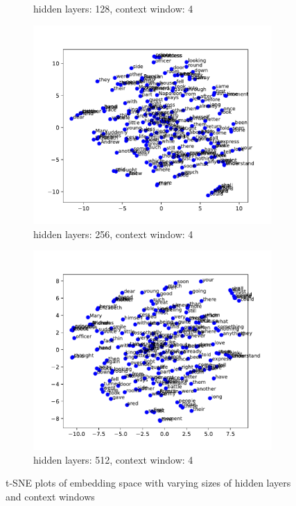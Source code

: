 \documentclass[12pt]{article} \usepackage{COSC420style} \usepackage{soul}
\begin{document}
\begin{figure}[htbp]
\begin{subfigure}[b]{0.45\textwidth}
		\caption{hidden layers: 128, context window: 4}
		\label{fig:128_4}
	\end{subfigure}
	\newline %
	\begin{subfigure}[b]{0.45\textwidth}
		\includegraphics[width=\textwidth]{./figures/dim_256_ctx_4_embedding.pdf}
		\caption{hidden layers: 256, context window: 4}
		\label{fig:256_4}
	\end{subfigure}
	\hfill %
	\begin{subfigure}[b]{0.45\textwidth}
		\includegraphics[width=\textwidth]{./figures/dim_512_ctx_4_embedding.pdf}
		\caption{hidden layers: 512, context window: 4}
		\label{fig:512_4}
	\end{subfigure}
	\caption{t-SNE plots of embedding space with varying sizes of hidden layers and context windows}
	\label{fig:larger_embeddings}
\end{figure}
\end{document}
